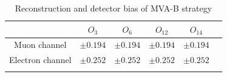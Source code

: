 		\begin{center}
		\begin{longtable}[H]{ c c c c c c }
		\caption{Reconstruction and detector bias of MVA-B strategy}\\
		\hline
		[\%] & $O_{3}$ & $O_{6}$ & $O_{12}$ & $O_{14}$ \\ 
		\hline{}
		Muon channel & $\pm0.194$ & $\pm0.194$ & $\pm0.194$ & $\pm0.194$ \\
		Electron channel & $\pm0.252$ & $\pm0.252$ & $\pm0.252$ & $\pm0.252$ \\
		\hline
		\label{AsymBias:tb:a05_noMlbcut_DetBias}
		\end{longtable}
		\end{center}

\FloatBarrier

